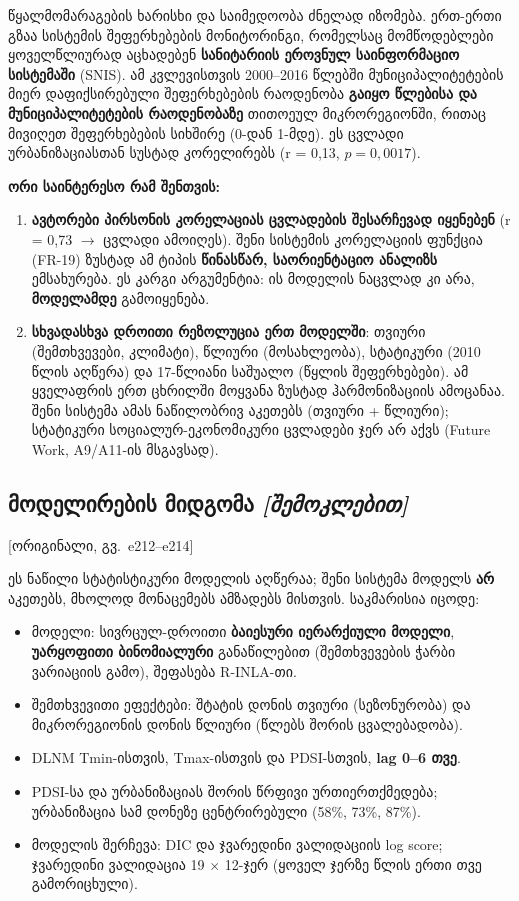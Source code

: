 \documentclass[11pt,a4paper]{article}
\newcommand{\pg}[1]{{\small\color{gray}[ორიგინალი, გვ.~#1]}}
\begin{document}
წყალმომარაგების ხარისხი და საიმედოობა ძნელად იზომება. ერთ-ერთი გზაა სისტემის შეფერხებების მონიტორინგი, რომელსაც მომწოდებლები
ყოველწლიურად აცხადებენ \textbf{სანიტარიის ეროვნულ საინფორმაციო სისტემაში} (SNIS). ამ კვლევისთვის 2000--2016 წლებში
მუნიციპალიტეტების მიერ დაფიქსირებული შეფერხებების რაოდენობა \textbf{გაიყო წლებისა და მუნიციპალიტეტების რაოდენობაზე} თითოეულ
მიკრორეგიონში, რითაც მივიღეთ შეფერხებების სიხშირე (0-დან 1-მდე). ეს ცვლადი ურბანიზაციასთან სუსტად კორელირებს
(r = 0,13, $p = 0{,}0017$).

\begin{etl}
\textbf{ორი საინტერესო რამ შენთვის:}
\begin{enumerate}[leftmargin=1.5em]
  \item \textbf{ავტორები პირსონის კორელაციას ცვლადების შესარჩევად იყენებენ} (r = 0,73 $\rightarrow$ ცვლადი ამოიღეს). შენი
    სისტემის კორელაციის ფუნქცია (FR-19) ზუსტად ამ ტიპის \textbf{წინასწარ, საორიენტაციო ანალიზს} ემსახურება. ეს კარგი არგუმენტია:
    ის მოდელის ნაცვლად კი არა, \textbf{მოდელამდე} გამოიყენება.
  \item \textbf{სხვადასხვა დროითი რეზოლუცია ერთ მოდელში}: თვიური (შემთხვევები, კლიმატი), წლიური (მოსახლეობა), სტატიკური
    (2010 წლის აღწერა) და 17-წლიანი საშუალო (წყლის შეფერხებები). ამ ყველაფრის ერთ ცხრილში მოყვანა ზუსტად ჰარმონიზაციის
    ამოცანაა. შენი სისტემა ამას ნაწილობრივ აკეთებს (თვიური + წლიური); სტატიკური სოციალურ-ეკონომიკური ცვლადები ჯერ არ აქვს
    (Future Work, A9/A11-ის მსგავსად).
\end{enumerate}
\end{etl}

\subsection*{მოდელირების მიდგომა \textit{[შემოკლებით]}} \pg{e212--e214}
\begin{skipbox}
ეს ნაწილი სტატისტიკური მოდელის აღწერაა; შენი სისტემა მოდელს \textbf{არ} აკეთებს, მხოლოდ მონაცემებს ამზადებს მისთვის.
საკმარისია იცოდე:
\begin{itemize}[leftmargin=1.5em]
  \item მოდელი: სივრცულ-დროითი \textbf{ბაიესური იერარქიული მოდელი}, \textbf{უარყოფითი ბინომიალური} განაწილებით (შემთხვევების
    ჭარბი ვარიაციის გამო), შეფასება R-INLA-თი.
  \item შემთხვევითი ეფექტები: შტატის დონის თვიური (სეზონურობა) და მიკრორეგიონის დონის წლიური (წლებს შორის ცვალებადობა).
  \item DLNM Tmin-ისთვის, Tmax-ისთვის და PDSI-სთვის, \textbf{lag 0--6 თვე}.
  \item PDSI-სა და ურბანიზაციას შორის წრფივი ურთიერთქმედება; ურბანიზაცია სამ დონეზე ცენტრირებული (58\%, 73\%, 87\%).
  \item მოდელის შერჩევა: DIC და ჯვარედინი ვალიდაციის log score; ჯვარედინი ვალიდაცია 19 $\times$ 12-ჯერ (ყოველ ჯერზე წლის ერთი თვე
    გამორიცხული).
\end{itemize}
\end{skipbox}
\end{document}
